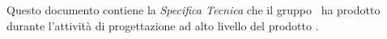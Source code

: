 Questo documento contiene la \textit{Specifica Tecnica} che il gruppo \gruppo\ ha prodotto durante l'attività di progettazione ad alto livello del prodotto \progetto.
